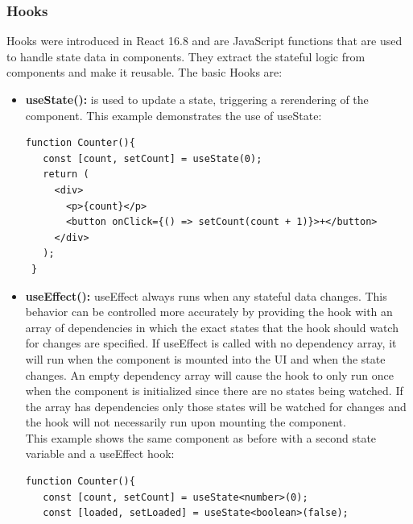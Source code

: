 \subsubsection{Hooks}
Hooks were introduced in React 16.8 and are JavaScript functions that are used to handle state data in components. They  extract the stateful logic from components and make it reusable. The basic Hooks are:
\begin{itemize}
\item \textbf{useState():} is used to update a state, triggering a rerendering of the component.
This example demonstrates the use of useState:
\begin{Verbatim}[frame=single]
 function Counter(){
   const [count, setCount] = useState(0);
   return (
     <div>
       <p>{count}</p>		            
       <button onClick={() => setCount(count + 1)}>+</button>
     </div>
   );
 }
\end{Verbatim}

\item \textbf{useEffect():} useEffect always runs when any stateful data changes. This behavior can be controlled more accurately by providing the hook with an array of dependencies in which the exact states that the hook should watch for changes are specified. If useEffect is called with no dependency array, it will run when the component is mounted into the UI and when the state changes. An empty dependency array will cause the hook to only run once when the component is initialized since there are no states being watched. If the array has dependencies only those states will be watched for changes and the hook will not necessarily run upon mounting the component.\\This example shows the same component as before with a second state variable and a useEffect hook:
\begin{Verbatim}[frame=single]
 function Counter(){
   const [count, setCount] = useState<number>(0);
   const [loaded, setLoaded] = useState<boolean>(false);
   

\end{Verbatim}
\end{itemize}
